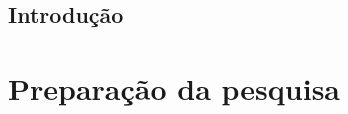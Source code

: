 \documentclass[
	12pt,				%
	openright,			%
	oneside,			%
	a4paper,			%
	english,			%
	french,				%
	spanish,			%
	brazil				%
	]{abntex2}
\begin{document}
\chapter*[Introdução]{Introdução}
%
%
%
%
%
%
%
%

\part{Preparação da pesquisa}
\end{document}
